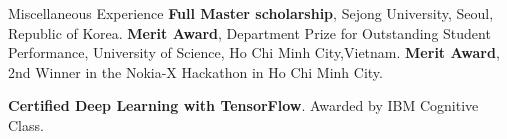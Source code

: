 \begin{rubric}{Miscellaneous Experience}
\entry*[2016 -- 2018]%
	\textbf{Full Master scholarship}, Sejong University, Seoul, Republic of Korea.
\entry*[2015]%
	\textbf{Merit Award}, Department Prize for Outstanding Student Performance, University of Science, Ho Chi Minh City,Vietnam.
\entry*[2014]%
	\textbf{Merit Award}, 2nd Winner in the Nokia-X Hackathon in Ho Chi Minh City.

\entry*[2017]%
	\textbf{Certified Deep Learning with TensorFlow}.  Awarded by IBM Cognitive Class.

\end{rubric}